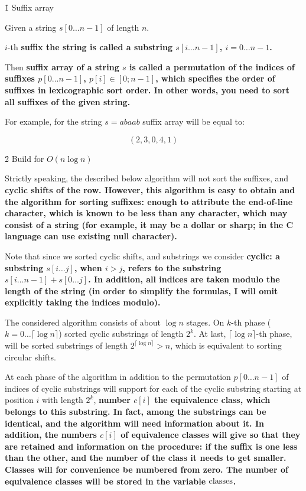 \h1{ Suffix array }

Given a string $s[0 \ldots n-1]$ of length $n$.

$i$-th \bf{suffix} the string is called a substring $s[i \ldots n-1]$, $i=0 \ldots n-1$.

Then \bf{suffix array} of a string $s$ is called a permutation of the indices of suffixes $p[0 \ldots n-1]$, $p[i] \in [0;n-1]$, which specifies the order of suffixes in lexicographic sort order. In other words, you need to sort all suffixes of the given string.

For example, for the string $s=abaab$ suffix array will be equal to:

$$ (2,3,0,4,1) $$


\h2{ Build for $O (n \log n)$ }

Strictly speaking, the described below algorithm will not sort the suffixes, and \bf{cyclic shifts} of the row. However, this algorithm is easy to obtain and the algorithm for sorting suffixes: enough to attribute the end-of-line character, which is known to be less than any character, which may consist of a string (for example, it may be a dollar or sharp; in the C language can use existing null character).

Note that since we sorted cyclic shifts, and substrings we consider \bf{cyclic}: a substring $s[i \ldots j]$, when $i > j$, refers to the substring $s[i \ldots n-1] + s[0 \ldots j]$. In addition, all indices are taken modulo the length of the string (in order to simplify the formulas, I will omit explicitly taking the indices modulo).

The considered algorithm consists of about $\log n$ stages. On $k$-th phase ($k = 0 \ldots \lceil \log n \rceil$) sorted cyclic substrings of length $2^k$. At last, $\lceil \log n \rceil$-th phase, will be sorted substrings of length $2^{\lceil \log n \rceil} > n$, which is equivalent to sorting circular shifts.

At each phase of the algorithm in addition to the permutation $p[0 \ldots n-1]$ of indices of cyclic substrings will support for each of the cyclic substring starting at position $i$ with length $2^k$, \bf{number $c[i]$ the equivalence class}, which belongs to this substring. In fact, among the substrings can be identical, and the algorithm will need information about it. In addition, the numbers $c[i]$ of equivalence classes will give so that they are retained and information on the procedure: if the suffix is one less than the other, and the number of the class it needs to get smaller. Classes will for convenience be numbered from zero. The number of equivalence classes will be stored in the variable $\rm classes$.

